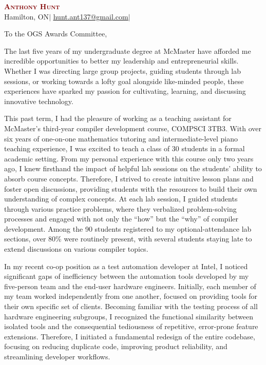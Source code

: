 \documentclass[11pt]{letter}
\makeatletter
\newcommand{\fullName}{Anthony Hunt}
\newcommand{\accentColour}{Maroon}
\newcommand{\currentCity}{Hamilton, ON}
\newcommand{\email}{\href{mailto:hunt.ant137@gmail.com}{\underline{hunt.ant137@gmail.com}}}
\newcommand{\githubUrl}[1]{%
   \href{#1}{\faGithubSquare}%
  }
\newcommand{\linkedinUrl}[1]{%
   \href{#1}{\faLinkedin}%
  }
\makeatother
\begin{document}
\begin{center}
    \textcolor{\accentColour}{\textbf{\Huge \scshape \fullName}} \\ \vspace{1pt}
    \small \currentCity $|$ \email $|$
    \linkedinUrl{https://linkedin.com/in/anthonyhunt137}
    \githubUrl{https://github.com/Ant13731}
\end{center}

\setlength\parindent{0pt}
To the OGS Awards Committee,
\setlength\parindent{24pt}

The last five years of my undergraduate degree at McMaster have afforded me incredible opportunities to better my leadership and entrepreneurial skills. Whether I was directing large group projects, guiding students through lab sessions, or working towards a lofty goal alongside like-minded people, these experiences have sparked my passion for cultivating, learning, and discussing innovative technology.

This past term, I had the pleasure of working as a teaching assistant for McMaster's third-year compiler development course, COMPSCI 3TB3. With over six years of one-on-one mathematics tutoring and intermediate-level piano teaching experience, I was excited to teach a class of 30 students in a formal academic setting. From my personal experience with this course only two years ago, I knew firsthand the impact of helpful lab sessions on the students' ability to absorb course concepts. Therefore, I strived to create intuitive lesson plans and foster open discussions, providing students with the resources to build their own understanding of complex concepts. At each lab session, I guided students through various practice problems, where they verbalized problem-solving processes and engaged with not only the “how” but the “why” of compiler development. Among the 90 students registered to my optional-attendance lab sections, over 80\% were routinely present, with several students staying late to extend discussions on various compiler topics.

In my recent co-op position as a test automation developer at Intel, I noticed significant gaps of inefficiency between the automation tools developed by my five-person team and the end-user hardware engineers. Initially, each member of my team worked independently from one another, focused on providing tools for their own specific set of clients. Becoming familiar with the testing process of all hardware engineering subgroups, I recognized the functional similarity between isolated tools and the consequential tediousness of repetitive, error-prone feature extensions. Therefore, I initiated a fundamental redesign of the entire codebase, focusing on reducing duplicate code, improving product reliability, and streamlining developer workflows.
\end{document}
